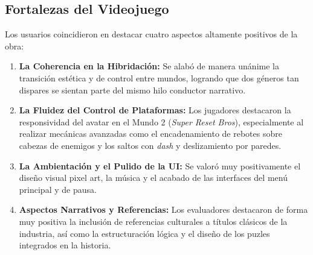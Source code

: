 \subsection{Fortalezas del Videojuego}
Los usuarios coincidieron en destacar cuatro aspectos altamente positivos de la obra:
\begin{enumerate}
    \item \textbf{La Coherencia en la Hibridación:} Se alabó de manera unánime la transición estética y de control entre mundos, logrando que dos géneros tan dispares se sientan parte del mismo hilo conductor narrativo.
    \item \textbf{La Fluidez del Control de Plataformas:} Los jugadores destacaron la responsividad del avatar en el Mundo 2 (\textit{Super Reset Bros}), especialmente al realizar mecánicas avanzadas como el encadenamiento de rebotes sobre cabezas de enemigos y los saltos con \textit{dash} y deslizamiento por paredes.
    \item \textbf{La Ambientación y el Pulido de la UI:} Se valoró muy positivamente el diseño visual pixel art, la música y el acabado de las interfaces del menú principal y de pausa.
    \item \textbf{Aspectos Narrativos y Referencias:} Los evaluadores destacaron de forma muy positiva la inclusión de referencias culturales a títulos clásicos de la industria, así como la estructuración lógica y el diseño de los puzles integrados en la historia.
\end{enumerate}

